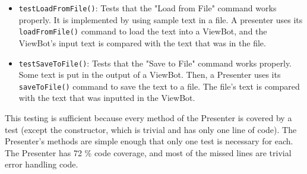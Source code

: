 \documentclass[11pt]{article}
\begin{document}
\begin{itemize}
\item \texttt{testLoadFromFile()}: Tests that the "Load from File" command works properly.  
It is implemented by using sample text in a file.  A presenter uses its \texttt{loadFromFile()} command to load the text into a ViewBot, and the ViewBot's input text is compared with the text that was in the file.
\item \texttt{testSaveToFile()}: Tests that the "Save to File" command works properly.
Some text is put in the output of a ViewBot.  Then, a Presenter uses its \texttt{saveToFile()} command to save the text to a file.  The file's text is compared with the text that was inputted in the ViewBot.
\end{itemize}

This testing is sufficient because every method of the Presenter is covered by a test (except the constructor, which is trivial and has only one line of code).  The Presenter's methods are simple enough that only one test is necessary for each.  The Presenter has 72 \% code coverage, and most of the missed lines are trivial error handling code.
\end{document}
